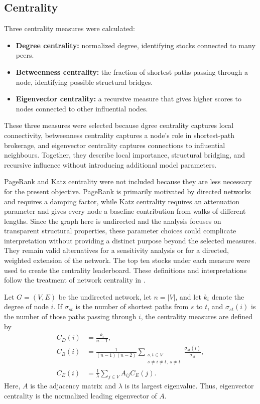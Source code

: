 \documentclass[12pt]{article}
\numberwithin{equation}{section}
\begin{document}
\subsection{Centrality}
Three centrality measures were calculated:
\begin{itemize}
  \item \textbf{Degree centrality:} normalized degree, identifying stocks
  connected to many peers.
  \item \textbf{Betweenness centrality:} the fraction of shortest paths passing
  through a node, identifying possible structural bridges.
  \item \textbf{Eigenvector centrality:} a recursive measure that gives higher
  scores to nodes connected to other influential nodes.
\end{itemize}
These three measures were selected because dgree
centrality captures local connectivity, betweenness centrality captures a
node's role in shortest-path brokerage, and eigenvector centrality captures
connections to influential neighbours. Together, they describe local
importance, structural bridging, and recursive influence without introducing
additional model parameters.

PageRank and Katz centrality were not included because they are less necessary
for the present objective. PageRank
is primarily motivated by directed networks and requires a damping factor,
while Katz centrality requires an attenuation parameter and gives every node a
baseline contribution from walks of different lengths. Since the graph here
is undirected and the analysis focuses on transparent structural properties,
these parameter choices could complicate interpretation without providing a
distinct purpose beyond the selected measures. They remain valid alternatives
for a sensitivity analysis or for a directed, weighted extension of the
network.
The top ten stocks under each measure were used to create the centrality
leaderboard. These definitions and interpretations follow the treatment of
network centrality in \cite{newman2018}.

Let $G=(V,E)$ be the undirected network, let $n=|V|$, and let $k_i$ denote
the degree of node $i$. If $\sigma_{st}$ is the number of shortest paths from
$s$ to $t$, and $\sigma_{st}(i)$ is the number of those paths passing through
$i$, the centrality measures are defined by
\begin{align}
  C_D(i) &= \frac{k_i}{n-1}, \\
  C_B(i) &= \frac{1}{(n-1)(n-2)}
  \sum_{\substack{s,t\in V\\s\ne i\ne t,\ s\ne t}}
  \frac{\sigma_{st}(i)}{\sigma_{st}}, \\
  C_E(i) &= \frac{1}{\lambda}\sum_{j\in V} A_{ij}C_E(j).
\end{align}
Here, $A$ is the adjacency matrix and $\lambda$ is its largest eigenvalue.
Thus, eigenvector centrality is the normalized leading eigenvector of $A$.
\end{document}
